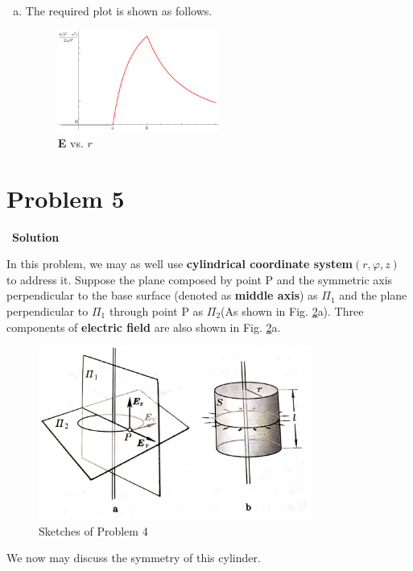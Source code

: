 \documentclass[12pt,a4paper]{article}
\begin{document}
\begin{enumerate}[(a)]
        \item The required plot is shown as follows.
        \begin{figure}[!htpb]
            \centering
            \includegraphics[width=0.5\textwidth]{hw2-p3-plot.png}
            \caption{\textbf{E} vs. $r$}
            \label{fig:3-plot}
        \end{figure}
\end{enumerate}

\section*{\large \textbf{Problem 5}}~{\textbf{Solution}}

In this problem, we may as well use \textbf{cylindrical coordinate system}$(r,\varphi,z)$ to address it. Suppose the plane composed by point P and the symmetric axis perpendicular to the base surface (denoted as \textbf{middle axis}) as $\Pi_1$ and the plane perpendicular to $\Pi_1$ through point P as $\Pi_2$(As shown in Fig. \ref{fig:4-sketch}a). Three components of \textbf{electric field} are also shown in Fig. \ref{fig:4-sketch}a.
\begin{figure}[!htpb]
    \centering
    \includegraphics[width=0.8\textwidth]{hw2-p4-sketch.jpg}
    \caption{Sketches of Problem 4}
    \label{fig:4-sketch}
\end{figure}

We now may discuss the symmetry of this cylinder.
\end{document}
